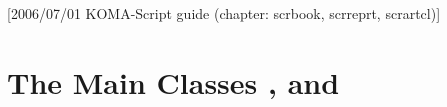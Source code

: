 %
%
%
%
%
%
%
%
% 
%
%
%
%

[2006/07/01 KOMA-Script guide (chapter:
scrbook, scrreprt, scrartcl)]


\chapter{The Main Classes ,  and
  }

%


